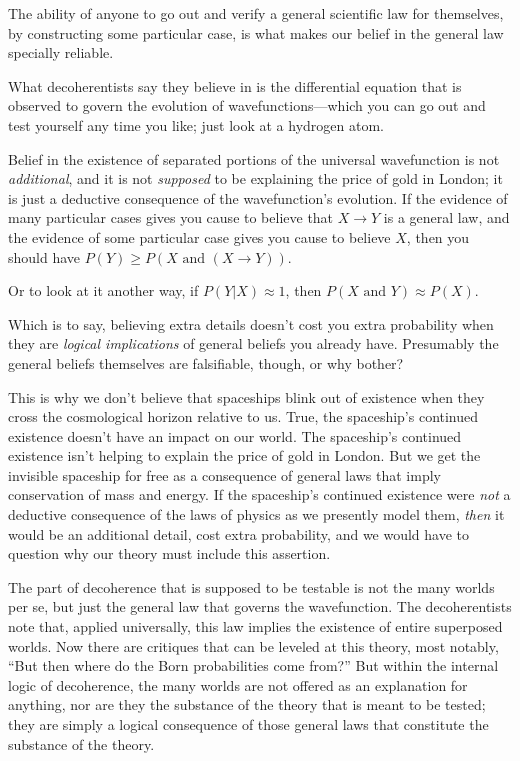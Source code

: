 {
 The ability of anyone to go out and verify a general scientific
law for themselves, by constructing some particular case, is what makes
our belief in the general law specially reliable.}

{
 What decoherentists say they believe in is the differential
equation that is observed to govern the evolution of
wavefunctions---which you can go out and test yourself any time you
like; just look at a hydrogen atom.}

{
 Belief in the existence of separated portions of the universal
wavefunction is not \textit{additional}, and it is not
\textit{supposed} to be explaining the price of gold in London; it is
just a deductive consequence of the wavefunction's
evolution. If the evidence of many particular cases gives you cause to
believe that $X \rightarrow  Y$ is a general law, and the evidence of
some particular case gives you cause to believe $X$, then you should have
$P(Y) \geq P(X \text{ and } (X \rightarrow Y))$.}

{
 Or to look at it another way, if $P(Y|X) \approx 1$,
then $P(X \text{ and } Y) \approx P(X)$.}

{
 Which is to say, believing extra details doesn't
cost you extra probability when they are \textit{logical implications}
of general beliefs you already have. Presumably the general beliefs
themselves are falsifiable, though, or why bother?}

{
 This is why we don't believe that spaceships blink
out of existence when they cross the cosmological horizon relative to
us. True, the spaceship's continued existence
doesn't have an impact on our world. The
spaceship's continued existence isn't
helping to explain the price of gold in London. But we get the
invisible spaceship for free as a consequence of general laws that
imply conservation of mass and energy. If the
spaceship's continued existence were \textit{not} a
deductive consequence of the laws of physics as we presently model
them, \textit{then} it would be an additional detail, cost extra
probability, and we would have to question why our theory must include
this assertion.}

{
 The part of decoherence that is supposed to be testable is not the
many worlds per se, but just the general law that governs the
wavefunction. The decoherentists note that, applied universally, this
law implies the existence of entire superposed worlds. Now there are
critiques that can be leveled at this theory, most notably,
``But then where do the Born probabilities come
from?'' But within the internal logic of decoherence,
the many worlds are not offered as an explanation for anything, nor are
they the substance of the theory that is meant to be tested; they are
simply a logical consequence of those general laws that constitute the
substance of the theory.}

